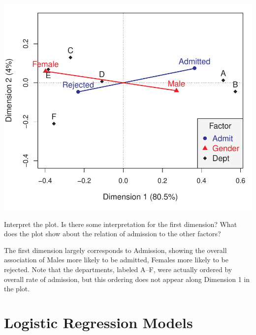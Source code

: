 \documentclass[10pt]{report}\usepackage[]{graphicx}\usepackage[]{color}
\newenvironment{knitrout}{}{} %
\renewenvironment{knitrout}{\small\renewcommand{\baselinestretch}{.85}}{} %
\begin{document}
\begin{Exercises}
\begin{enumerate*}
\begin{ans}
\begin{knitrout}
\centerline{\includegraphics[width=.5\textwidth]{soln/fig/ex6_13b-1} }



\end{knitrout}
    \end{ans}
    
    \item Interpret the plot.  Is there some interpretation for the first dimension?
    What does the plot show about the relation of admission to the other factors?
    \begin{ans}
    The first dimension largely corresponds to Admission, showing the overall association
    of Males more likely to be admitted, Females more likely to be rejected.
    Note that the departments, labeled A--F, were actually ordered by overall
    rate of admission, but this ordering does not appear along Dimension 1
    in the plot.
    \end{ans}
    
  \end{enumerate*}

\end{Exercises}


\clearpage
\chapter{Logistic Regression Models}\label{ch:logistic}
\end{document}
